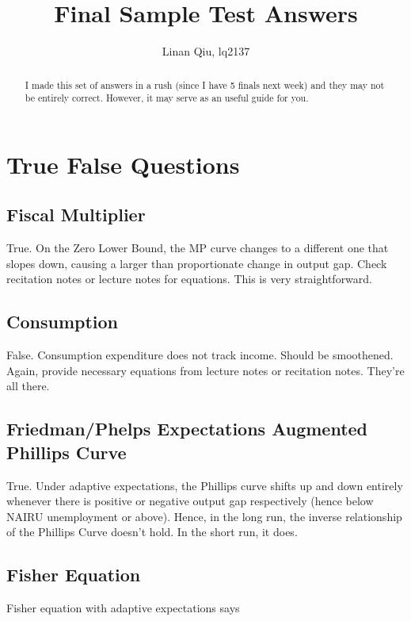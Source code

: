 \documentclass[11pt]{scrartcl}
\title{Final Sample Test Answers}
\author{Linan Qiu, lq2137}
\begin{document}
\maketitle

\begin{abstract}
I made this set of answers in a rush (since I have 5 finals next week) and they may not be entirely correct. However, it may serve as an useful guide for you.
\end{abstract}

\section{True False Questions}

\subsection{Fiscal Multiplier}

True. On the Zero Lower Bound, the MP curve changes to a different one that slopes down, causing a larger than proportionate change in output gap. Check recitation notes or lecture notes for equations. This is very straightforward.

\subsection{Consumption}

False. Consumption expenditure does not track income. Should be smoothened. Again, provide necessary equations from lecture notes or recitation notes. They're all there.

\subsection{Friedman/Phelps Expectations Augmented Phillips Curve}

True. Under adaptive expectations, the Phillips curve shifts up and down entirely whenever there is positive or negative output gap respectively (hence below NAIRU unemployment or above). Hence, in the long run, the inverse relationship of the Phillips Curve doesn't hold. In the short run, it does.

\subsection{Fisher Equation}

Fisher equation with adaptive expectations says
\end{document}
